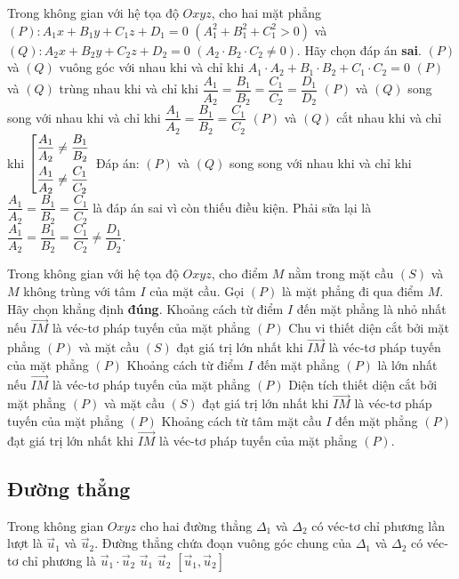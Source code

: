 \begin{ex}%
	Trong không gian với hệ tọa độ $Oxyz$, cho hai mặt phẳng $(P)\colon A_1x+B_1y+C_1z+D_1=0$ $(A_1^2+B_1^2+C_1^2 > 0)$ và $(Q)\colon A_2x+B_2y+C_2z+D_2=0$ $(A_2\cdot B_2\cdot C_2 \ne0)$. Hãy chọn đáp án \textbf{sai}.
	\choice
	{$(P)$ và $(Q)$ vuông góc với nhau khi và chỉ khi $A_1\cdot A_2+B_1\cdot B_2+C_1\cdot C_2=0$}
	{$(P)$ và $(Q)$ trùng nhau khi và chỉ khi $\dfrac{A_1}{A_2}=\dfrac{B_1}{B_2}=\dfrac{C_1}{C_2}=\dfrac{D_1}{D_2}$}
	{\True $(P)$ và $(Q)$ song song với nhau khi và chỉ khi $\dfrac{A_1}{A_2}=\dfrac{B_1}{B_2}=\dfrac{C_1}{C_2}$}
	{$(P)$ và $(Q)$ cắt nhau khi và chỉ khi $\left[\begin{aligned}&\dfrac{A_1}{A_2}\ne \dfrac{B_1}{B_2}\\&\dfrac{A_1}{A_2}\ne \dfrac{C_1}{C_2}\end{aligned}\right.$}
	\loigiai
	{
		Đáp án: $(P)$ và $(Q)$ song song với nhau khi và chỉ khi $\dfrac{A_1}{A_2}=\dfrac{B_1}{B_2}=\dfrac{C_1}{C_2}$ là đáp án sai vì còn thiếu điều kiện. Phải sửa lại là $\dfrac{A_1}{A_2}=\dfrac{B_1}{B_2}=\dfrac{C_1}{C_2}\ne \dfrac{D_1}{D_2}$.
	}
\end{ex}

\begin{ex}%
	Trong không gian với hệ tọa độ $Oxyz$, cho điểm $M$ nằm trong mặt cầu $(S)$ và $M$ không trùng với tâm $I$ của mặt cầu. Gọi $(P)$ là mặt phẳng đi qua điểm $M$. Hãy chọn khẳng định \textbf{đúng}.
	\choice
	{Khoảng cách từ điểm $I$ đến mặt phẳng là nhỏ nhất nếu $\overrightarrow{IM}$ là véc-tơ pháp tuyến của mặt phẳng $(P)$}
	{Chu vi thiết diện cắt bởi mặt phẳng $(P)$ và mặt cầu $(S)$ đạt giá trị lớn nhất khi $\overrightarrow{IM}$ là véc-tơ pháp tuyến của mặt phẳng $(P)$}
	{\True Khoảng cách từ điểm $I$ đến mặt phẳng $(P)$ là lớn nhất nếu $\overrightarrow{IM}$ là véc-tơ pháp tuyến của mặt phẳng $(P)$}
	{Diện tích thiết diện cắt bởi mặt phẳng $(P)$ và mặt cầu $(S)$ đạt giá trị lớn nhất khi $\overrightarrow{IM}$ là véc-tơ pháp tuyến của mặt phẳng $(P)$}
	\loigiai
	{
		Khoảng cách từ tâm mặt cầu $I$ đến mặt phẳng $(P)$ đạt giá trị lớn nhất khi $\overrightarrow{IM}$ là véc-tơ pháp tuyến của mặt phẳng $(P)$.
	}
\end{ex}

\subsection{Đường thẳng}
\begin{ex}%
	Trong không gian $Oxyz$  cho hai đường thẳng $\Delta_1$ và $\Delta_2$ có véc-tơ chỉ phương lần lượt là $\vec{u}_1$ và $\vec{u}_2$. Đường thẳng chứa đoạn vuông góc chung của $\Delta_1$ và $\Delta_2$ có véc-tơ chỉ phương là
	\choice
	{$\vec{u}_1 \cdot \vec{u}_2$}
	{$\vec{u}_1$}
	{$\vec{u}_2$}
	{\True $\left[\vec{u}_1,\vec{u}_2\right]$}
\end{ex}

